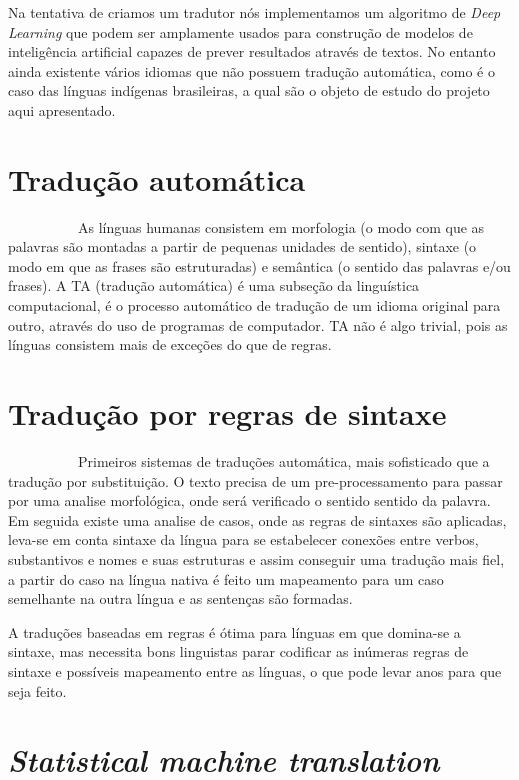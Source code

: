 \documentclass[12pt]{article}
\begin{document}
Na tentativa de criamos um tradutor nós implementamos um algoritmo de \textit{Deep Learning} que podem ser amplamente usados para construção de modelos de inteligência artificial capazes de prever resultados através de textos. No entanto ainda existente vários idiomas que não possuem tradução automática, como é o caso das línguas indígenas brasileiras, a qual são o objeto de estudo do projeto aqui apresentado.

\section{Tradução automática}
~~~~~~~~~~As línguas humanas consistem em morfologia (o modo com que as palavras são montadas a partir de pequenas unidades de sentido), sintaxe (o modo em que as frases são estruturadas) e semântica (o sentido das palavras e/ou frases).
A TA (tradução automática) é uma subseção da linguística computacional, é o processo automático de tradução de um idioma original para outro, através do uso de programas de computador. TA não é algo trivial, pois as línguas consistem mais de exceções do que de regras.


\section{Tradução por regras de sintaxe}

~~~~~~~~~~Primeiros sistemas de traduções automática, mais sofisticado que a tradução por substituição. O texto precisa de um pre-processamento para passar por uma analise morfológica, onde será verificado o sentido sentido da palavra. Em seguida existe uma analise de casos, onde as regras de sintaxes são aplicadas, leva-se em conta sintaxe da língua para se estabelecer conexões entre verbos, substantivos e nomes e suas estruturas e assim conseguir uma tradução mais fiel, a partir do caso na língua nativa é feito um mapeamento para um caso semelhante na outra língua e as sentenças são formadas\cite{6516319}. 

A traduções baseadas em regras é ótima para línguas em que domina-se a sintaxe, mas necessita bons linguistas parar codificar as inúmeras regras de sintaxe e possíveis mapeamento entre as línguas, o que pode levar anos para que seja feito\cite{SMT}.

\section{\textit{Statistical machine translation}}
\end{document}
